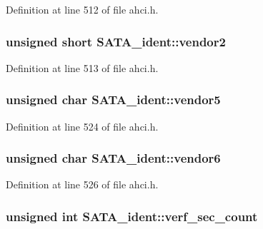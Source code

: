 Definition at line 512 of file ahci.\+h.

\subsubsection[{\texorpdfstring{vendor2}{vendor2}}]{\setlength{\rightskip}{0pt plus 5cm}unsigned short S\+A\+T\+A\+\_\+ident\+::vendor2}\hypertarget{structSATA__ident_a7c5a4057f43da3eff3935c977d634a0d}{}\label{structSATA__ident_a7c5a4057f43da3eff3935c977d634a0d}


Definition at line 513 of file ahci.\+h.

\subsubsection[{\texorpdfstring{vendor5}{vendor5}}]{\setlength{\rightskip}{0pt plus 5cm}unsigned char S\+A\+T\+A\+\_\+ident\+::vendor5}\hypertarget{structSATA__ident_ab565f3b27395b9d783a6c1a5752c1090}{}\label{structSATA__ident_ab565f3b27395b9d783a6c1a5752c1090}


Definition at line 524 of file ahci.\+h.

\subsubsection[{\texorpdfstring{vendor6}{vendor6}}]{\setlength{\rightskip}{0pt plus 5cm}unsigned char S\+A\+T\+A\+\_\+ident\+::vendor6}\hypertarget{structSATA__ident_ab39d63c6a76245c7b33ae8bdf0928859}{}\label{structSATA__ident_ab39d63c6a76245c7b33ae8bdf0928859}


Definition at line 526 of file ahci.\+h.

\subsubsection[{\texorpdfstring{verf\+\_\+sec\+\_\+count}{verf_sec_count}}]{\setlength{\rightskip}{0pt plus 5cm}unsigned int S\+A\+T\+A\+\_\+ident\+::verf\+\_\+sec\+\_\+count}\hypertarget{structSATA__ident_ac94f9f7b192f2f636310b6718d752aea}{}\label{structSATA__ident_ac94f9f7b192f2f636310b6718d752aea}


